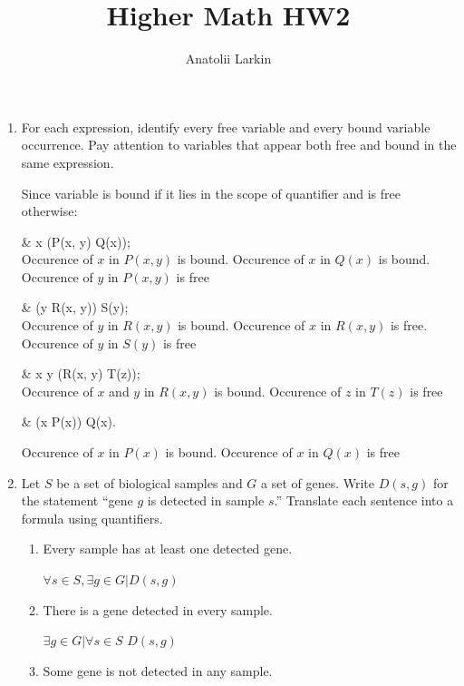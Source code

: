 \documentclass[12pt]{article}
\title{Higher Math HW2}
\author{Anatolii Larkin}
\begin{document}
\maketitle

\begin{enumerate}

    \item For each expression, identify every free variable and every bound variable occurrence.
Pay attention to variables that appear both free and bound in the same expression.

Since variable is bound if it lies in the scope of quantifier and is free otherwise:


 \quad & \forall x (P(x, y) \Rightarrow Q(x)); \\

Occurence of $x$ in $P(x,y)$ is bound. Occurence of $x$ in $Q(x)$ is bound. Occurence of $y$ in $P(x,y)$ is free

 \quad & (\exists y R(x, y)) \land S(y); \\

Occurence of $y$ in $R(x,y)$ is bound. Occurence of $x$ in $R(x,y)$ is free. Occurence of $y$ in $S(y)$ is free

 \quad & \forall x \exists y (R(x, y) \land T(z)); \\

Occurence of $x$ and $y$ in $R(x,y)$ is bound. Occurence of $z$ in $T(z)$ is free

 \quad & (\forall x P(x)) \lor Q(x).

Occurence of $x$ in $P(x)$ is bound. Occurence of $x$ in $Q(x)$ is free

\item  Let \(S\) be a set of biological samples and \(G\) a set of genes. Write \(D(s, g)\) for the statement ``gene \(g\) is detected in sample \(s\).'' Translate each sentence into a formula using quantifiers.


\begin{enumerate}
    \item Every sample has at least one detected gene.
    
    $ \forall s \in S, \exists g \in G | D(s,g)$
    
    \item There is a gene detected in every sample.

    $ \exists g \in G | \forall s \in S$ $D(s,g)$
    \item Some gene is not detected in any sample.


\end{enumerate}
\end{enumerate}
\end{document}
